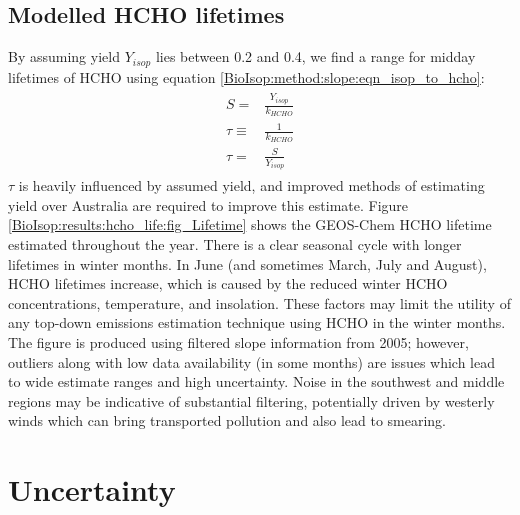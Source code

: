   \subsection{Modelled HCHO lifetimes}
    \label{BioIsop:results:hcho_life}
    By assuming yield $Y_{isop}$ lies between 0.2 and 0.4, we find a range for midday lifetimes of HCHO using equation \ref{BioIsop:method:slope:eqn_isop_to_hcho}:
    \begin{eqnarray} \begin{split}
    \label{Model:results:hcho_life:eqn_smearing_vs_yield}
    S = & \frac{Y_{isop}}{k_{HCHO}} \\
    \tau \equiv & \frac{1}{k_{HCHO}} \\
    \tau = & \frac{S}{Y_{isop}}
    \end{split} \end{eqnarray}
    $\tau$ is heavily influenced by assumed yield, and improved methods of estimating yield over Australia are required to improve this estimate.
    Figure \ref{BioIsop:results:hcho_life:fig_Lifetime} shows the GEOS-Chem HCHO lifetime estimated throughout the year.
    There is a clear seasonal cycle with longer lifetimes in winter months.
    In June (and sometimes March, July and August), HCHO lifetimes increase, which is caused by the reduced winter HCHO concentrations, temperature, and insolation.
    These factors may limit the utility of any top-down emissions estimation technique using HCHO in the winter months.
    The figure is produced using filtered slope information from 2005; however, outliers along with low data availability (in some months) are issues which lead to wide estimate ranges and high uncertainty.
    Noise in the southwest and middle regions may be indicative of substantial filtering, potentially driven by westerly winds which can bring transported pollution and also lead to smearing.
    
    
\section{Uncertainty}
\label{BioIsop:uncertainty}
  
